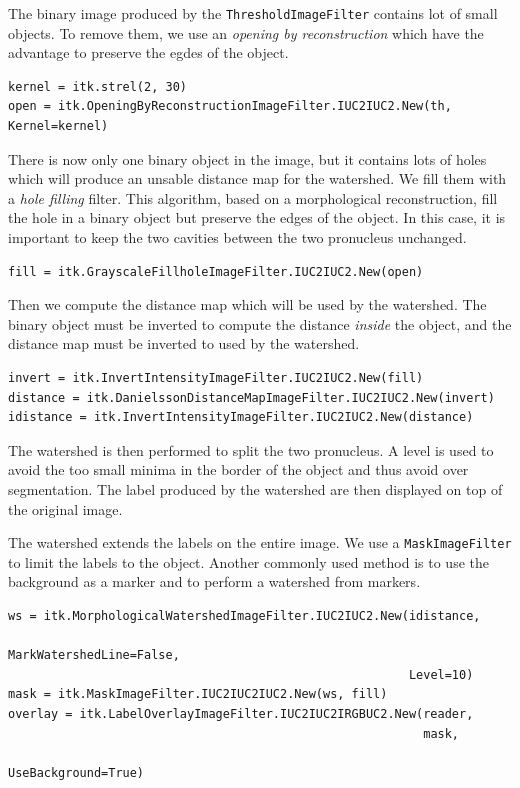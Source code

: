 \documentclass{InsightArticle}
\begin{document}
The binary image produced by the \verb$ThresholdImageFilter$ contains lot
of small objects. To remove them, we use an {\em opening by reconstruction}
which have the advantage to preserve the egdes of the object.

\small \begin{verbatim}
kernel = itk.strel(2, 30)
open = itk.OpeningByReconstructionImageFilter.IUC2IUC2.New(th, Kernel=kernel)
\end{verbatim} \normalsize

There is now only one binary object in the image, but it contains lots of holes
which will produce an unsable distance map for the watershed. We fill them
with a {\em hole filling} filter. This algorithm, based on a morphological
reconstruction, fill the hole in a binary object but preserve the edges of the
object. In this case, it is important to keep the two cavities between the two
pronucleus unchanged.

\small \begin{verbatim}
fill = itk.GrayscaleFillholeImageFilter.IUC2IUC2.New(open)
\end{verbatim} \normalsize

Then we compute the distance map which will be used by the watershed. The
binary object must be inverted to compute the distance {\em inside} the
object, and the distance map must be inverted to used by the watershed.

\small \begin{verbatim}
invert = itk.InvertIntensityImageFilter.IUC2IUC2.New(fill)
distance = itk.DanielssonDistanceMapImageFilter.IUC2IUC2.New(invert)
idistance = itk.InvertIntensityImageFilter.IUC2IUC2.New(distance)
\end{verbatim} \normalsize

The watershed is then performed to split the two pronucleus. A level
is used to avoid the too small minima in the border of the object and thus
avoid over segmentation. The label produced by the watershed are then
displayed on top of the original image.

The watershed extends the labels on the entire image. We use a
\verb$MaskImageFilter$ to limit the labels to the object. Another commonly
used method is to use the background as a marker and to perform a watershed
from markers.

\small \begin{verbatim}
ws = itk.MorphologicalWatershedImageFilter.IUC2IUC2.New(idistance,
                                                        MarkWatershedLine=False,
                                                        Level=10)
mask = itk.MaskImageFilter.IUC2IUC2IUC2.New(ws, fill)
overlay = itk.LabelOverlayImageFilter.IUC2IUC2IRGBUC2.New(reader,
                                                          mask,
                                                          UseBackground=True)
\end{verbatim} \normalsize
\end{document}
